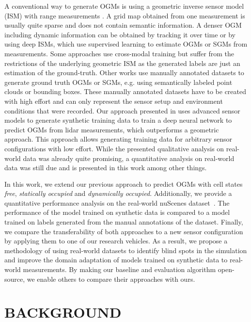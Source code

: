 \documentclass[conference]{IEEEtran}
\begin{document}
A conventional way to generate OGMs is using a geometric inverse sensor model (ISM) with range measurements \cite{Thrun.2005}. A grid map obtained from one measurement is usually quite sparse and does not contain semantic information. A denser OGM including dynamic information can be obtained by tracking it over time \cite{Nuss.2018} or by using deep ISMs, which use supervised learning to estimate OGMs or SGMs from measurements. Some approaches use cross-modal training \cite{Bauer.2019b} but suffer from the restrictions of the underlying geometric ISM as the generated labels are just an estimation of the ground-truth. Other works use manually annotated datasets \cite{Bieder.2020, Lee.03.08.2020, Fei.2021b, Schreiber.2021b} to generate ground truth OGMs or SGMs, e.g. using semantically labeled point clouds or bounding boxes. These manually annotated datasets have to be created with high effort and can only represent the sensor setup and environment conditions that were recorded. Our approach presented in \cite{vanKempen.2021b} uses advanced sensor models to generate synthetic training data to train a deep neural network to predict OGMs from lidar measurements, which outperforms a geometric approach. This approach allows generating training data for arbitrary sensor configurations with low effort. While the presented qualitative analysis on real-world data was already quite promising, a quantitative analysis on real-world data was still due and is presented in this work among other things.

In this work, we extend our previous approach to predict OGMs with cell states \textit{free}, \textit{statically occupied} and \textit{dynamically occupied}. Additionally, we provide a quantitative performance analysis on the real-world nuScenes dataset~\cite{Caesar.2020}. The performance of the model trained on synthetic data is compared to a model trained on labels generated from the manual annotations of the dataset. Finally, we compare the transferability of both approaches to a new sensor configuration by applying them to one of our research vehicles. As a result, we propose a methodology of using real-world datasets to identify blind spots in the simulation and improve the domain adaptation of models trained on synthetic data to real-world measurements. By making our baseline and evaluation algorithm open-source, we enable others to compare their approaches with ours.


\section{BACKGROUND}
\end{document}
